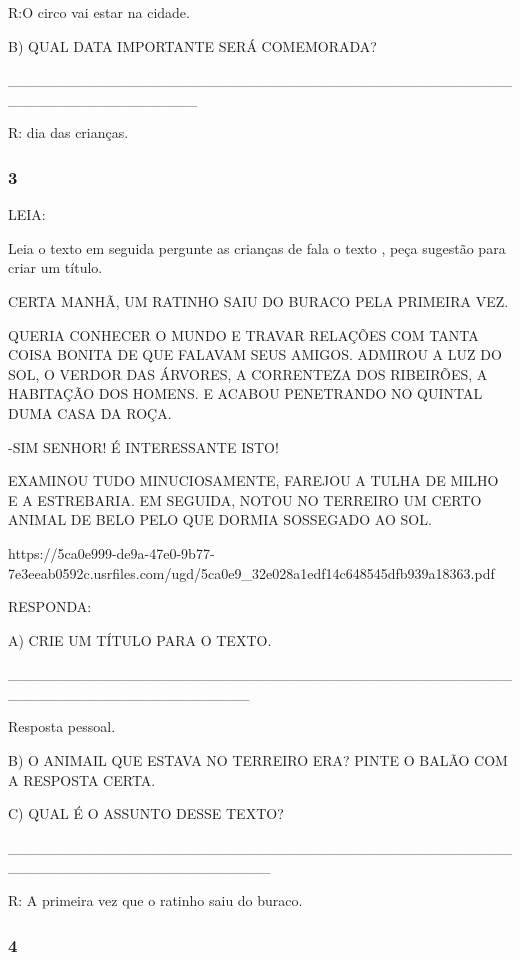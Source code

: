 R:O circo vai estar na cidade.

B) QUAL DATA IMPORTANTE SERÁ COMEMORADA?

\_\_\_\_\_\_\_\_\_\_\_\_\_\_\_\_\_\_\_\_\_\_\_\_\_\_\_\_\_\_\_\_\_\_\_\_\_\_\_\_\_\_\_\_\_\_\_\_\_\_\_\_\_\_\_\_\_\_\_\_\_\_\_\_\_\_

R: dia das crianças.

\subsubsection{3 }\label{section-57}

LEIA:

Leia o texto em seguida pergunte as crianças de fala o texto , peça
sugestão para criar um título.

CERTA MANHÃ, UM RATINHO SAIU DO BURACO PELA PRIMEIRA VEZ.

QUERIA CONHECER O MUNDO E TRAVAR RELAÇÕES COM TANTA COISA BONITA DE QUE
FALAVAM SEUS AMIGOS. ADMIROU A LUZ DO SOL, O VERDOR DAS ÁRVORES, A
CORRENTEZA DOS RIBEIRÕES, A HABITAÇÃO DOS HOMENS. E ACABOU PENETRANDO NO
QUINTAL DUMA CASA DA ROÇA.

-SIM SENHOR! É INTERESSANTE ISTO!

EXAMINOU TUDO MINUCIOSAMENTE, FAREJOU A TULHA DE MILHO E A ESTREBARIA.
EM SEGUIDA, NOTOU NO TERREIRO UM CERTO ANIMAL DE BELO PELO QUE DORMIA
SOSSEGADO AO SOL.

https://5ca0e999-de9a-47e0-9b77-7e3eeab0592c.usrfiles.com/ugd/5ca0e9\_32e028a1edf14c648545dfb939a18363.pdf

RESPONDA:

A) CRIE UM TÍTULO PARA O TEXTO.

\_\_\_\_\_\_\_\_\_\_\_\_\_\_\_\_\_\_\_\_\_\_\_\_\_\_\_\_\_\_\_\_\_\_\_\_\_\_\_\_\_\_\_\_\_\_\_\_\_\_\_\_\_\_\_\_\_\_\_\_\_\_\_\_\_\_\_\_\_\_\_

Resposta pessoal.

B) O ANIMAIL QUE ESTAVA NO TERREIRO ERA? PINTE O BALÃO COM A RESPOSTA
CERTA.

C) QUAL É O ASSUNTO DESSE TEXTO?

\_\_\_\_\_\_\_\_\_\_\_\_\_\_\_\_\_\_\_\_\_\_\_\_\_\_\_\_\_\_\_\_\_\_\_\_\_\_\_\_\_\_\_\_\_\_\_\_\_\_\_\_\_\_\_\_\_\_\_\_\_\_\_\_\_\_\_\_\_\_\_\_\_

R: A primeira vez que o ratinho saiu do buraco.

\subsubsection{4 }\label{section-58}

